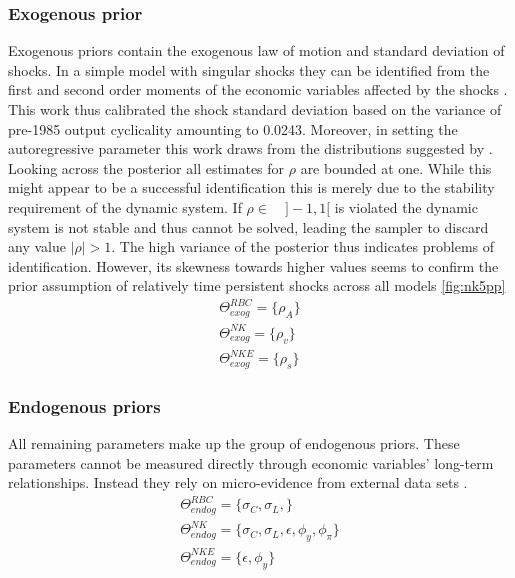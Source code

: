 \documentclass[12pt,a4paper,english]{article} %
\begin{document}
	\subsubsection{Exogenous prior}
	Exogenous priors contain the exogenous law of motion and standard deviation of shocks. In a simple model with singular shocks they can be identified from the first and second order moments of the economic variables affected by the shocks \cite{del_negro_forming_2008}. This work thus calibrated the shock standard deviation based on the variance of pre-1985 output cyclicality amounting to 0.0243. Moreover, in setting the autoregressive parameter this work draws from the distributions suggested by \cite{vasconez_what_nodate}. Looking across the posterior all estimates for $\rho$ are bounded at one. While this might appear to be a successful identification this is merely due to the stability requirement of the dynamic system. If $\rho \in \quad ]-1,1[ $ is violated the dynamic system is not stable and thus cannot be solved, leading the sampler to discard any value $|\rho| > 1$. The high variance of the posterior thus indicates problems of identification. However, its skewness towards higher values seems to confirm the prior assumption of relatively time persistent shocks across all models \ref{fig:nk5pp}
	\begin{equation}
		\begin{aligned}
			\Theta_{exog}^{RBC} = \{\rho_A \} \\
			\Theta_{exog}^{NK} = \{\rho_v \} \\
			\Theta_{exog}^{NKE} = \{\rho_s \}
		\end{aligned}
	\end{equation}

	\subsubsection{Endogenous priors}
	All remaining parameters make up the group of endogenous priors. These parameters cannot be measured directly through economic variables' long-term relationships. Instead they rely on micro-evidence from external data sets \cite{del_negro_forming_2008}. 
		\begin{equation}
		\begin{aligned}
			\Theta_{endog}^{RBC} = \{\sigma_C, \sigma_L, \} \\
			\Theta_{endog}^{NK} = \{\sigma_C, \sigma_L, \epsilon, \phi_{y}, \phi_{\pi} \} \\
			\Theta_{endog}^{NKE} = \{\epsilon, \phi_{y}\}
		\end{aligned}
	\end{equation}
		
\end{document}
